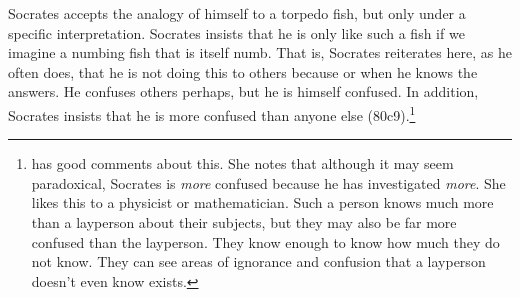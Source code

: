 \documentclass[11pt]{article}
\begin{document}
Socrates accepts the analogy of himself to a torpedo fish, but only under a specific interpretation. Socrates insists that he is only like such a fish if we imagine a numbing fish that is itself numb. That is, Socrates reiterates here, as he often does, that he is not doing this to others because or when he knows the answers. He confuses others perhaps, but he is himself confused. In addition, Socrates insists that he is more confused than anyone else (80c9).\footnote{\citet[71--72]{fine2014} has good comments about this. She notes that although it may seem paradoxical, Socrates is \emph{more} confused because he has investigated \emph{more}. She likes this to a physicist or mathematician. Such a person knows much more than a layperson about their subjects, but they may also be far more confused than the layperson. They know enough to know how much they do not know. They can see areas of ignorance and confusion that a layperson doesn't even know exists.}


\newpage


\end{document}
